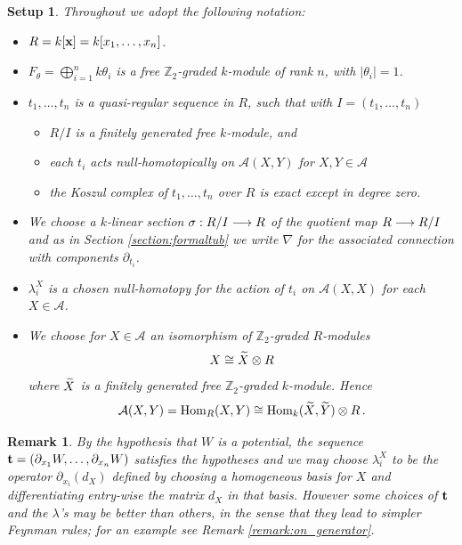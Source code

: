 \documentclass[english,letter paper,12pt,leqno]{article}
\newtheorem{setup}[theorem]{Setup}
\theoremstyle{example}
\newtheorem{remark}[theorem]{Remark}
\numberwithin{equation}{section}
\def\AA{\mathcal{A}}
\def\stab{\operatorname{stab}}
\def\Hom{\operatorname{Hom}}
\def\be{\begin{equation}}
\def\ee{\end{equation}}
\def\nZ{\mathds{Z}}
\begin{document}
\begin{setup}\label{setup:overall} Throughout we adopt the following notation:
\begin{itemize}
\item $R = k[\bold{x}] = k[x_1,\ldots,x_n]$.
\item $F_\theta = \bigoplus_{i=1}^n k\theta_i$ is a free $\mathbb{Z}_2$-graded $k$-module of rank $n$, with $|\theta_i| = 1$.
\item $t_1,\ldots,t_n$ is a quasi-regular sequence in $R$, such that with $I = (t_1,\ldots,t_n)$
\begin{itemize}
\item $R/I$ is a finitely generated free $k$-module, and
\item each $t_i$ acts null-homotopically on $\AA(X,Y)$ for $X,Y \in \AA$
\item the Koszul complex of $t_1,\ldots,t_n$ over $R$ is exact except in degree zero.
\end{itemize}
\item We choose a $k$-linear section $\sigma: R/I \longrightarrow R$ of the quotient map $R \longrightarrow R/I$ and as in Section \ref{section:formaltub} we write $\nabla$ for the associated connection with components $\partial_{t_i}$.
\item $\lambda_i^X$ is a chosen null-homotopy for the action of $t_i$ on $\AA(X,X)$ for each $X \in \AA$.
\item We choose for $X \in \AA$ an isomorphism of $\nZ_2$-graded $R$-modules
\[
X \cong \widetilde{X} \otimes R
\]
where $\widetilde{X}$ is a finitely generated free $\nZ_2$-graded $k$-module. Hence
\be
\AA(X,Y) = \Hom_R(X,Y) \cong \Hom_k(\coeff{X},\coeff{Y}) \otimes R\,.\label{eq:chosenCiso}
\ee
\end{itemize}
\end{setup}

\begin{remark} By the hypothesis that $W$ is a potential, the sequence $\bold{t} = (\partial_{x_1} W, \ldots, \partial_{x_n} W)$ satisfies the hypotheses and we may choose $\lambda_i^X$ to be the operator $\partial_{x_i}(d_X)$ defined by choosing a homogeneous basis for $X$ and differentiating entry-wise the matrix $d_X$ in that basis. However some choices of $\bold{t}$ and the $\lambda$'s may be better than others, in the sense that they lead to simpler Feynman rules; for an example see Remark \ref{remark:on_generator}.%
\end{remark}
\end{document}
